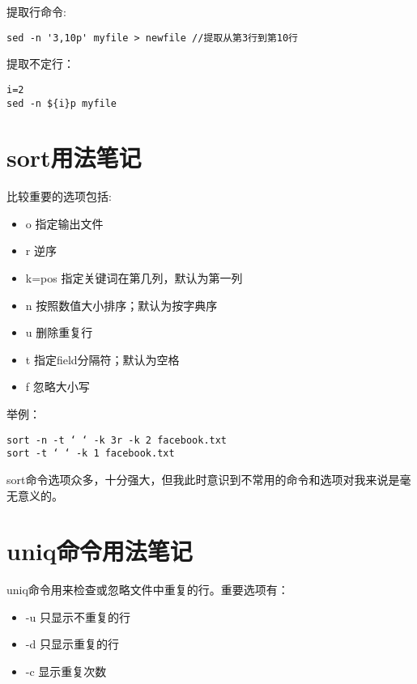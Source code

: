 提取行命令:
\begin{verbatim}
sed -n '3,10p' myfile > newfile //提取从第3行到第10行
\end{verbatim}

提取不定行：
\begin{verbatim}
i=2
sed -n ${i}p myfile
\end{verbatim}


\section{sort用法笔记}
比较重要的选项包括:

\begin{itemize}
    \item o 指定输出文件
    \item r 逆序
    \item k=pos 指定关键词在第几列，默认为第一列
    \item n 按照数值大小排序；默认为按字典序
    \item u 删除重复行
    \item t 指定field分隔符；默认为空格
    \item f 忽略大小写 
\end{itemize}


举例：
\begin{verbatim}
sort -n -t ‘ ‘ -k 3r -k 2 facebook.txt
sort -t ‘ ‘ -k 1 facebook.txt
\end{verbatim}

sort命令选项众多，十分强大，但我此时意识到不常用的命令和选项对我来说是毫无意义的。
\section{uniq命令用法笔记}

uniq命令用来检查或忽略文件中重复的行。重要选项有：

\begin{itemize}
    \item -u 只显示不重复的行
    \item -d 只显示重复的行
    \item -c 显示重复次数
\end{itemize}



